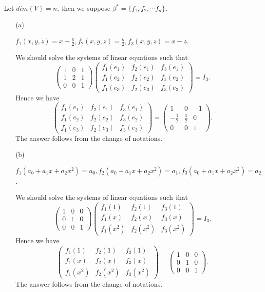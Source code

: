 \begin{Exercise}
Let $dim(V) = n$, then we suppose $\beta^* = \{f_1,f_2,\cdots f_n\}$.
\begin{enumerate}[(a)]
\item[(a)]
\begin{answer}
$f_1(x,y,z) = x-\frac{y}{2},f_2(x,y,z) = \frac{y}{2},f_3(x,y,z) = x-z$.
\end{answer}
\begin{solution}
We should solve the systems of linear equations such that
$$
\begin{pmatrix}
1 & 0 & 1 \\
1 & 2 & 1 \\
0 & 0 & 1
\end{pmatrix} \begin{pmatrix}
f_1(e_1) & f_2(e_1) & f_3(e_1) \\
f_1(e_2) & f_2(e_2) & f_3(e_2) \\
f_1(e_3) & f_2(e_3) & f_3(e_3)
\end{pmatrix} = I_3.
$$
Hence we have
$$
\begin{pmatrix}
f_1(e_1) & f_2(e_1) & f_3(e_1) \\
f_1(e_2) & f_2(e_2) & f_3(e_2) \\
f_1(e_3) & f_2(e_3) & f_3(e_3)
\end{pmatrix} = \begin{pmatrix}
1 & 0 & -1 \\
-\frac{1}{2} & \frac{1}{2} & 0 \\
0 & 0 & 1
\end{pmatrix}.
$$
The answer follows from the change of notations.
\end{solution}

\item[(b)]
\begin{answer}
$f_1(a_0+a_1 x+a_2 x^2) = a_0,f_2(a_0+a_1 x+a_2 x^2) = a_1,f_3(a_0+a_1 x+a_2 x^2) = a_2$.
\end{answer}
\begin{solution}
We should solve the systems of linear equations such that
$$
\begin{pmatrix}
1 & 0 & 0 \\
0 & 1 & 0 \\
0 & 0 & 1
\end{pmatrix} \begin{pmatrix}
f_1(1) & f_2(1) & f_3(1) \\
f_1(x) & f_2(x) & f_3(x) \\
f_1(x^2) & f_2(x^2) & f_3(x^2)
\end{pmatrix} = I_3.
$$
Hence we have
$$
\begin{pmatrix}
f_1(1) & f_2(1) & f_3(1) \\
f_1(x) & f_2(x) & f_3(x) \\
f_1(x^2) & f_2(x^2) & f_3(x^2)
\end{pmatrix} = \begin{pmatrix}
1 & 0 & 0 \\
0 & 1 & 0 \\
0 & 0 & 1
\end{pmatrix}.
$$
The answer follows from the change of notations.
\end{solution}

\end{enumerate}
\end{Exercise}